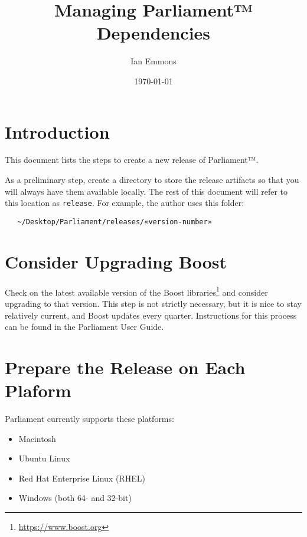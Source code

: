 \documentclass[12pt,letterpaper,draft]{article}
\title{Managing Parliament™ Dependencies}
\author{Ian Emmons}
\date{\today}
\newcommand{\urlcite}[1]{\footnote{\url{#1}}}
\begin{document}
\maketitle



\section{Introduction}

This document lists the steps to create a new release of Parliament™.

As a preliminary step, create a directory to store the release artifacts so that you will always have them available locally.  The rest of this document will refer to this location as \texttt{release}.  For example, the author uses this folder:

\begin{verbatim}
   ~/Desktop/Parliament/releases/«version-number»
\end{verbatim}



\section{Consider Upgrading Boost}

Check on the latest available version of the Boost libraries\urlcite{https://www.boost.org} and consider upgrading to that version.  This step is not strictly necessary, but it is nice to stay relatively current, and Boost updates every quarter.  Instructions for this process can be found in the Parliament User Guide.



\section{Prepare the Release on Each Plaform}

Parliament currently supports these platforms:
\begin{itemize}[noitemsep]
	\item Macintosh
	\item Ubuntu Linux
	\item Red Hat Enterprise Linux (RHEL)
	\item Windows (both 64- and 32-bit)
\end{itemize}
\end{document}
